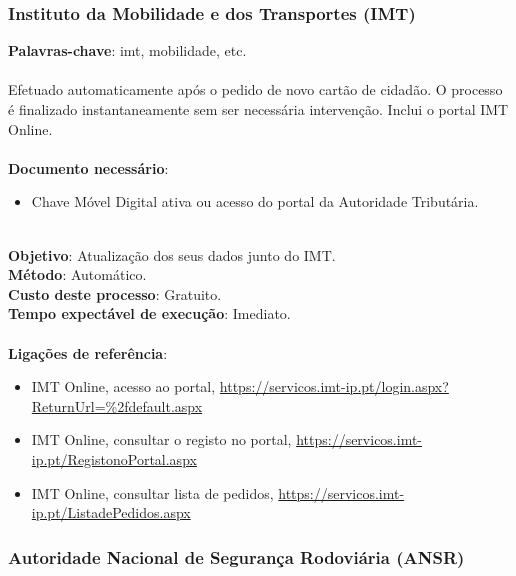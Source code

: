 \subsubsection{Instituto da Mobilidade e dos Transportes (IMT)}

\textbf{Palavras-chave}: imt, mobilidade, etc. \\
\\
Efetuado automaticamente após o pedido de novo cartão de cidadão. O
processo é finalizado instantaneamente sem ser necessária intervenção.
Inclui o portal IMT Online. \\
\\
\textbf{Documento necessário}:
\begin{itemize}
	\item Chave Móvel Digital ativa ou acesso do portal da Autoridade Tributária.
\end{itemize}
\leavevmode\\
\textbf{Objetivo}: Atualização dos seus dados junto do IMT. \\
\textbf{Método}: Automático. \\
\textbf{Custo deste processo}: Gratuito. \\
\textbf{Tempo expectável de execução}: Imediato. \\
\\
\textbf{Ligações de referência}:
\begin{itemize}
	\item IMT Online, acesso ao portal, \url{https://servicos.imt-ip.pt/login.aspx?ReturnUrl=\%2fdefault.aspx}
	\item IMT Online, consultar o registo no portal, \url{https://servicos.imt-ip.pt/RegistonoPortal.aspx}
	\item IMT Online, consultar lista de pedidos, \url{https://servicos.imt-ip.pt/ListadePedidos.aspx}
\end{itemize}

\subsubsection{Autoridade Nacional de Segurança Rodoviária (ANSR)}


